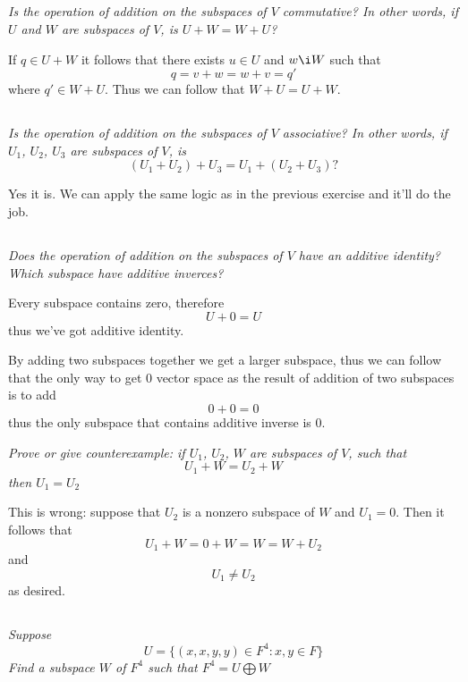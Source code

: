 \documentclass[11pt,oneside,titlepage]{book}
\begin{document}
\subsection{}
\textit{Is the operation of addition on the subspaces of $V$ commutative? In
  other words, if $U$ and $W$ are subspaces of $V$, is $U + W = W + U$?}

If $q \in U + W$ it follows that there exists $u \in U$ and $w \i W$
such that
$$q = v + w = w + v = q'$$
where $q' \in W + U$. Thus we can follow that $W + U = U + W$.

\subsection{}

\textit{Is the operation of addition on the subspaces of $V$ associative? In
  other words, if $U_1$, $U_2$, $U_3$ are subspaces of $V$, is}
$$(U_1 + U_2) + U_3 = U_1 + (U_2 + U_3)?$$

Yes it is. We can apply the same logic as in the previous exercise and it'll do
the job.

\subsection{}

\textit{Does the operation of addition on the subspaces of $V$ have an additive
  identity? Which subspace have additive inverces?}

Every subspace contains zero, therefore
$$U + 0 = U$$
thus we've got additive identity.

By adding two subspaces together we get a larger subspace, thus we can follow
that the only way to get 0 vector space as the result of addition of two
subspaces is to add
$$0 + 0 = 0$$
thus the only subspace that contains additive inverse is $0$.

\textit{Prove or give counterexample: if $U_1$, $U_2$, $W$ are subspaces of
  $V$, such that }
$$U_1 + W = U_2 + W$$
\textit{then $U_1 = U_2$}

This is wrong: suppose that $U_2$ is a nonzero subspace of $W$ and $U_1 = 0$.
Then it follows that
$$U_1 + W = 0 + W = W = W + U_2$$
and
$$U_1 \neq U_2$$
as desired.

\subsection{}

\textit{Suppose}
$$U = \{(x, x, y, y) \in F^4: x, y \in F\}$$
\textit{Find a subspace $W$ of $F^4$ such that $F^4 = U \bigoplus W$ }
\end{document}
